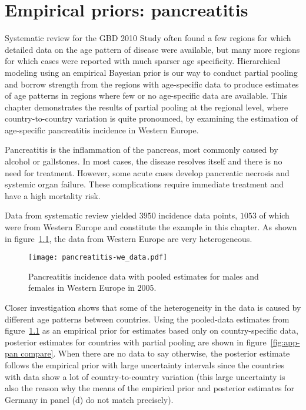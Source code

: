\chapter{Empirical priors: pancreatitis}
\label{applications-priors_empirical}

Systematic review for the GBD 2010 Study often found a few regions for
which detailed data on the age pattern of disease were available, but
many more regions for which cases were reported with much sparser
age specificity.  Hierarchical modeling using an empirical Bayesian
prior is our way to conduct partial pooling and borrow strength from
the regions with age-specific data to produce estimates of age
patterns in regions where few or no age-specific data are
available.  This chapter demonstrates the results of partial pooling
at the regional level, where country-to-country variation is quite
pronounced, by examining the estimation of age-specific pancreatitis
incidence in Western Europe.

Pancreatitis is the inflammation of the pancreas, most commonly
caused by alcohol or gallstones.  In most cases, the disease resolves
itself and there is no need for treatment.  However, some acute
cases develop pancreatic necrosis and systemic organ failure.  These
complications require immediate treatment and have a high mortality risk.
\cite{raraty_acute_2004, banks_epidemiology_2002, sekimoto_jpn_2006}

Data from systematic review yielded $3950$ incidence data points,
$1053$ of which were from Western Europe and constitute the example
in this chapter.  As shown in figure~\ref{fig:app-pan data}, the data
from Western Europe are very heterogeneous.

    \begin{figure}[h]
        \begin{center}
            \texttt{[image: pancreatitis-we\_data.pdf]}
            \caption[Systematic review data for pancreatitis with estimates.]{Pancreatitis incidence data with pooled estimates for males and females in Western 
            Europe in 2005.}
            \label{fig:app-pan data}
        \end{center}
    \end{figure}

Closer investigation shows that some of the heterogeneity in the data
is caused by different age patterns between countries.  Using the
pooled-data estimates from figure~\ref{fig:app-pan data} as an
empirical prior for estimates based only on country-specific data,
posterior estimates for countries with partial pooling are shown in
figure~\ref{fig:app-pan compare}.  When there are no data to say
otherwise, the posterior estimate follows the empirical prior with large
uncertainty intervals since the countries with data show a lot of
country-to-country variation (this large uncertainty is also the
reason why the means of the empirical prior and posterior estimates for Germany
in panel (d) do not match precisely).


